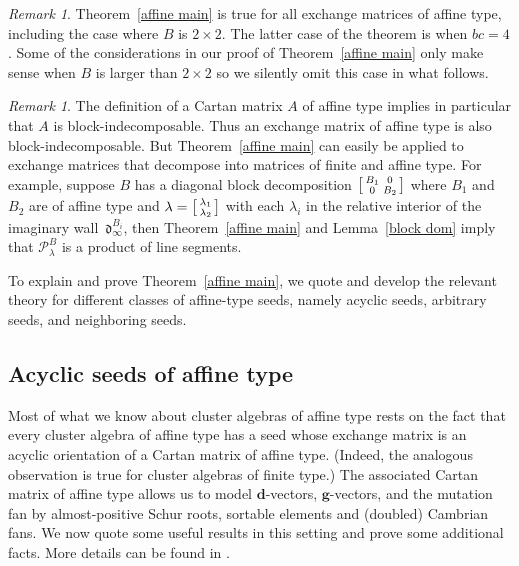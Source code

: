 \documentclass[10pt]{article}
\theoremstyle{definition}
\theoremstyle{remark}
\newtheorem{remark}[proposition]{Remark}
\numberwithin{equation}{section}
\newcommand{\0}{{\mathbf{0}}}
\newcommand{\g}{\mathbf{g}}
\renewcommand{\P}{\mathcal{P}}
\renewcommand{\d}{{\mathfrak d}}
\newcommand{\dd}{{\mathbf d}}
\begin{document}
\begin{remark}\label{2x2}
Theorem~\ref{affine main} is true for all exchange matrices of affine type, including the case where $B$ is $2\times2$.
The latter case of the theorem is \cite[Theorem 1.2]{RSDom} when $bc=4$.  
Some of the considerations in our proof of Theorem~\ref{affine main} only make sense when $B$ is larger than $2\times2$ so we silently omit this case in what follows.
\end{remark}

\begin{remark}\label{indecomposable}
The definition of a Cartan matrix $A$ of affine type implies in particular that $A$ is block-indecomposable.
Thus an exchange matrix of affine type is also block-indecomposable.
But Theorem~\ref{affine main} can easily be applied to exchange matrices that decompose into matrices of finite and affine type.
For example, suppose $B$ has a diagonal block decomposition $\begin{bsmallmatrix}B_1&0\\0&B_2\end{bsmallmatrix}$ where $B_1$ and $B_2$ are of affine type and $\lambda=\begin{bsmallmatrix}\lambda_1\\\lambda_2\end{bsmallmatrix}$ with each $\lambda_i$ in the relative interior of the imaginary wall~$\d^{B_i}_\infty$, then Theorem~\ref{affine main} and Lemma~\ref{block dom} imply that $\P_\lambda^B$ is a product of line segments.

\end{remark}

To explain and prove Theorem~\ref{affine main}, we quote and develop the relevant theory for different classes of affine-type seeds, namely acyclic seeds, arbitrary seeds, and neighboring seeds.

\subsection{Acyclic seeds of affine type}\label{acyc sec}
Most of what we know about cluster algebras of affine type rests on the fact that every cluster algebra of affine type has a seed whose exchange matrix is an acyclic orientation of a Cartan matrix of affine type.
(Indeed, the analogous observation is true for cluster algebras of finite type.)
The associated Cartan matrix of affine type allows us to model $\dd$-vectors, $\g$-vectors, and the mutation fan by almost-positive Schur roots, sortable elements and (doubled) Cambrian fans.
We now quote some useful results in this setting and prove some additional facts.
More details can be found in \cite{affdenom,framework,afframe,affscat}.
\end{document}
